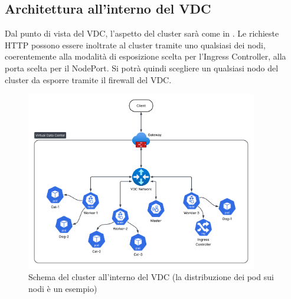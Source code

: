 \documentclass[12pt,a4paper,openright,twoside]{book}
\begin{document}
\subsection{Architettura all'interno del VDC}
Dal punto di vista del VDC, l'aspetto del cluster sarà come in . Le richieste HTTP possono essere inoltrate al cluster tramite uno qualsiasi dei nodi,
coerentemente alla modalità di esposizione scelta per l'Ingress Controller, alla porta scelta per il NodePort. Si potrà quindi scegliere un qualsiasi nodo del cluster 
da esporre tramite il firewall del VDC.
\begin{figure}[!hbt]
    \centering
    \includegraphics[width=0.9\textwidth]{figures/test-vdc.png}
    \caption{Schema del cluster all'interno del VDC (la distribuzione dei pod sui nodi è un esempio)}
    \label{fig:test-vdc}
\end{figure}
\FloatBarrier
\end{document}
